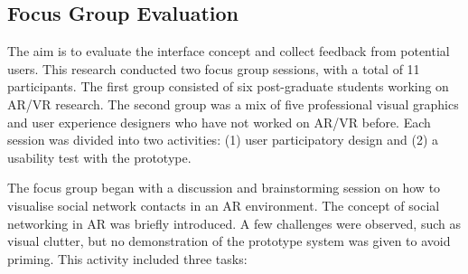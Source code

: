 \subsection{Focus Group Evaluation}

The aim is to evaluate the interface concept and collect feedback from potential users. This research conducted two focus group sessions, with a total of 11 participants. The first group consisted of six post-graduate students working on AR/VR research. The second group was a mix of five professional visual graphics and user experience designers who have not worked on AR/VR before. Each session was divided into two activities: (1) user participatory design and (2) a usability test with the prototype. 

The focus group began with a discussion and brainstorming session on how to visualise social network contacts in an AR environment. The concept of social networking in AR was briefly introduced. A few challenges were observed, such as visual clutter, but no demonstration of the prototype system was given to avoid priming. This activity included three tasks: 

